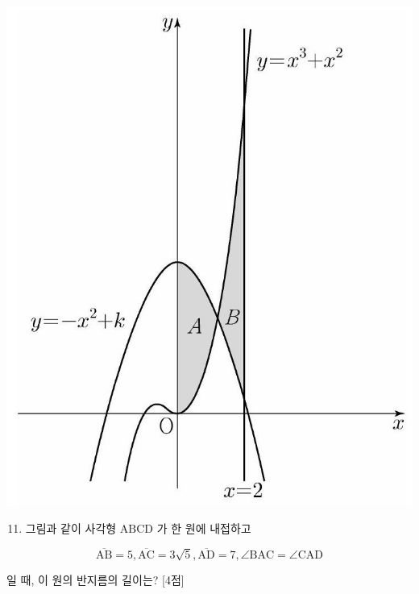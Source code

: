 \documentclass[10pt]{article}
\begin{document}
\begin{center}
\includegraphics[max width=\textwidth]{2023_06_06_b380aa8523ec7afae994g-23}
\end{center}

\begin{enumerate}
  \setcounter{enumi}{10}
  \item 그림과 같이 사각형 $\mathrm{ABCD}$ 가 한 원에 내접하고
\end{enumerate}

$$
\overline{\mathrm{AB}}=5, \overline{\mathrm{AC}}=3 \sqrt{5}, \overline{\mathrm{AD}}=7, \angle \mathrm{BAC}=\angle \mathrm{CAD}
$$

일 때, 이 원의 반지름의 길이는? [4점]
\end{document}
